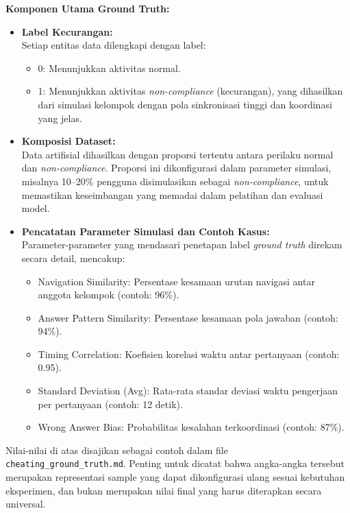 \textbf{Komponen Utama Ground Truth:}
\begin{itemize}
    \item \textbf{Label Kecurangan:} \\
    Setiap entitas data dilengkapi dengan label:
    \begin{itemize}
        \item 0: Menunjukkan aktivitas normal.
        \item 1: Menunjukkan aktivitas \textit{non-compliance} (kecurangan), yang dihasilkan dari simulasi kelompok dengan pola sinkronisasi tinggi dan koordinasi yang jelas.
    \end{itemize}
    \item \textbf{Komposisi Dataset:} \\
    Data artifisial dihasilkan dengan proporsi tertentu antara perilaku normal dan \textit{non-compliance}. Proporsi ini dikonfigurasi dalam parameter simulasi, misalnya 10--20\% pengguna disimulasikan sebagai \textit{non-compliance}, untuk memastikan keseimbangan yang memadai dalam pelatihan dan evaluasi model.
    \item \textbf{Pencatatan Parameter Simulasi dan Contoh Kasus:} \\
    Parameter-parameter yang mendasari penetapan label \textit{ground truth} direkam secara detail, mencakup:
    \begin{itemize}
        \item Navigation Similarity: Persentase kesamaan urutan navigasi antar anggota kelompok (contoh: 96\%).
        \item Answer Pattern Similarity: Persentase kesamaan pola jawaban (contoh: 94\%).
        \item Timing Correlation: Koefisien korelasi waktu antar pertanyaan (contoh: 0.95).
        \item Standard Deviation (Avg): Rata-rata standar deviasi waktu pengerjaan per pertanyaan (contoh: 12 detik).
        \item Wrong Answer Bias: Probabilitas kesalahan terkoordinasi (contoh: 87\%).
    \end{itemize}
\end{itemize}

Nilai-nilai di atas disajikan sebagai contoh dalam file \texttt{cheating\_ground\_truth.md}. Penting untuk dicatat bahwa angka-angka tersebut merupakan representasi sample yang dapat dikonfigurasi ulang sesuai kebutuhan eksperimen, dan bukan merupakan nilai final yang harus diterapkan secara universal.

